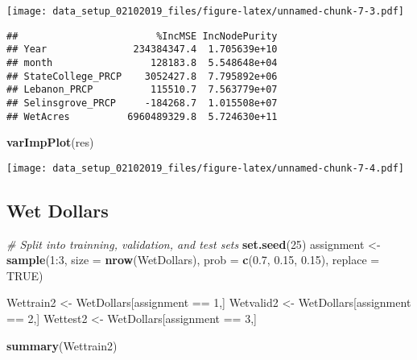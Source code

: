\documentclass[]{article}
\newenvironment{Shaded}{\begin{snugshade}}{\end{snugshade}}
\newcommand{\KeywordTok}[1]{\textcolor[rgb]{0.13,0.29,0.53}{\textbf{{#1}}}}
\newcommand{\DataTypeTok}[1]{\textcolor[rgb]{0.13,0.29,0.53}{{#1}}}
\newcommand{\DecValTok}[1]{\textcolor[rgb]{0.00,0.00,0.81}{{#1}}}
\newcommand{\FloatTok}[1]{\textcolor[rgb]{0.00,0.00,0.81}{{#1}}}
\newcommand{\StringTok}[1]{\textcolor[rgb]{0.31,0.60,0.02}{{#1}}}
\newcommand{\CommentTok}[1]{\textcolor[rgb]{0.56,0.35,0.01}{\textit{{#1}}}}
\newcommand{\OtherTok}[1]{\textcolor[rgb]{0.56,0.35,0.01}{{#1}}}
\newcommand{\NormalTok}[1]{{#1}}
\begin{document}
\texttt{[image: data\_setup\_02102019\_files/figure-latex/unnamed-chunk-7-3.pdf]}

\begin{Shaded}
\end{Shaded}

\begin{verbatim}
##                        %IncMSE IncNodePurity
## Year               234384347.4  1.705639e+10
## month                 128183.8  5.548648e+04
## StateCollege_PRCP    3052427.8  7.795892e+06
## Lebanon_PRCP          115510.7  7.563779e+07
## Selinsgrove_PRCP     -184268.7  1.015508e+07
## WetAcres          6960489329.8  5.724630e+11
\end{verbatim}

\begin{Shaded}
\begin{Highlighting}[]
\KeywordTok{varImpPlot}\NormalTok{(res)                      }
\end{Highlighting}
\end{Shaded}

\texttt{[image: data\_setup\_02102019\_files/figure-latex/unnamed-chunk-7-4.pdf]}

\subsection{Wet Dollars}\label{wet-dollars}

\begin{Shaded}
\begin{Highlighting}[]
\CommentTok{# Split into trainning, validation, and test sets}
\KeywordTok{set.seed}\NormalTok{(}\DecValTok{25}\NormalTok{)}
\NormalTok{assignment <-}\StringTok{ }\KeywordTok{sample}\NormalTok{(}\DecValTok{1}\NormalTok{:}\DecValTok{3}\NormalTok{, }\DataTypeTok{size =} \KeywordTok{nrow}\NormalTok{(WetDollars), }\DataTypeTok{prob =} \KeywordTok{c}\NormalTok{(}\FloatTok{0.7}\NormalTok{, }\FloatTok{0.15}\NormalTok{, }\FloatTok{0.15}\NormalTok{), }\DataTypeTok{replace =} \OtherTok{TRUE}\NormalTok{)}

\NormalTok{Wettrain2 <-}\StringTok{ }\NormalTok{WetDollars[assignment ==}\StringTok{ }\DecValTok{1}\NormalTok{,]}
\NormalTok{Wetvalid2 <-}\StringTok{ }\NormalTok{WetDollars[assignment ==}\StringTok{ }\DecValTok{2}\NormalTok{,]}
\NormalTok{Wettest2 <-}\StringTok{ }\NormalTok{WetDollars[assignment ==}\StringTok{ }\DecValTok{3}\NormalTok{,]}

\KeywordTok{summary}\NormalTok{(Wettrain2)}
\end{Highlighting}
\end{Shaded}
\end{document}
